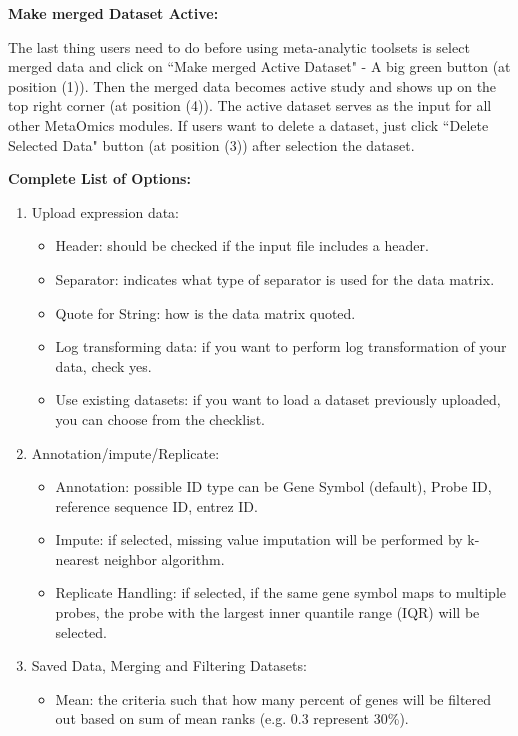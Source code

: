 \begin{steps}
\item \textbf{Make merged Dataset Active:}

\label{sec:active}
The last thing users need to do before using meta-analytic toolsets is select merged data and click on 
``Make merged Active Dataset" - A big green button (at position {\color{red} (1)}).
Then the merged data becomes active study and shows up on the top right corner (at position {\color{red} (4)}).
The active dataset serves as the input for all other MetaOmics modules.
If users want to delete a dataset, just click ``Delete Selected Data" button (at position {\color{red} (3)}) after selection the dataset.

\end{steps}

\textbf{Complete List of Options:} 
\begin{enumerate}
\item Upload expression data:
\begin{itemize}
\item Header: should be checked if the input file includes a header.
\item Separator: indicates what type of separator is used for the data matrix.
\item Quote for String: how is the data matrix quoted.
\item Log transforming data: if you want to perform log transformation of your data, check yes.
\item Use existing datasets: if you want to load a dataset previously uploaded, you can choose from the checklist.
\end{itemize}
\item Annotation/impute/Replicate:
\begin{itemize}
\item Annotation: possible ID type can be Gene Symbol (default), Probe ID, reference sequence ID, entrez ID.
\item Impute: if selected, missing value imputation will be performed by k-nearest neighbor algorithm.
\item Replicate Handling: if selected, if the same gene symbol maps to multiple probes, the probe with the largest inner quantile range (IQR) will be selected.
\end{itemize}
\item Saved Data, Merging and Filtering Datasets:
\begin{itemize}
\item Mean: the criteria such that how many percent of genes will be filtered out based on sum of mean ranks (e.g. 0.3 represent 30\%).

\end{itemize}
\end{enumerate}
